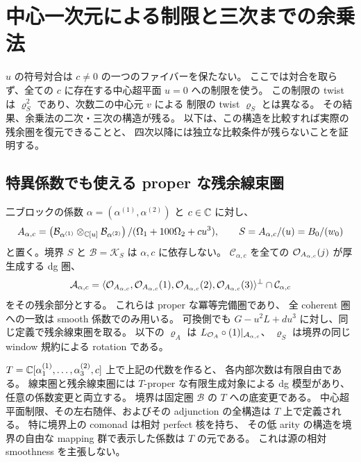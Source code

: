 \section{中心一次元による制限と三次までの余乗法}
\label{mix:sec:central-spherical-reconstruction}

$u$ の符号対合は $c\ne0$ の一つのファイバーを保たない。
ここでは対合を取らず、全ての $c$ に存在する中心超平面 $u=0$ への制限を使う。
この制限の twist は $\varrho_S^2$ であり、次数二の中心元 $v$ による
制限の twist $\varrho_S$ とは異なる。
その結果、余乗法の二次・三次の構造が残る。
以下は、この構造を比較すれば実際の残余圏を復元できることと、
四次以降には独立な比較条件が残らないことを証明する。

\subsection{特異係数でも使える proper な残余線束圏}

二ブロックの係数 $\alpha=(\alpha^{(1)},\alpha^{(2)})$ と $c\in\mathbb C$ に対し、
\[
 A_{\alpha,c}
 =\left(\mathcal B_{\alpha^{(1)}}\otimes_{\mathbb C[u]}
                   \mathcal B_{\alpha^{(2)}}\right)
       /(\Omega_1+100\Omega_2+cu^3),\qquad
 S=A_{\alpha,c}/(u)=B_0/(w_0)
\]
と置く。境界 $S$ と $\mathcal B=\mathcal K_S$ は $\alpha,c$ に依存しない。
$\mathcal C_{\alpha,c}$ を全ての $\mathcal O_{A_{\alpha,c}}(j)$ が厚生成する dg 圏、
\[
 \mathcal A_{\alpha,c}
 =\langle\mathcal O_{A_{\alpha,c}},\mathcal O_{A_{\alpha,c}}(1),
                   \mathcal O_{A_{\alpha,c}}(2),\mathcal O_{A_{\alpha,c}}(3)\rangle^\perp
       \cap\mathcal C_{\alpha,c}
\]
をその残余部分とする。
これらは proper な冪等完備圏であり、
全 coherent 圏への一致は smooth 係数でのみ用いる。
可換側でも $G-u^2L+du^3$ に対し、同じ定義で残余線束圏を取る。
以下の $\varrho_A$ は
$L_{\mathcal O_A}\circ(1)|_{\mathcal A_{\alpha,c}}$、
$\varrho_S$ は境界の同じ window 規約による rotation である。

\begin{lemma}
\label{cmo:lem:central-universal-line-model}
$T=\mathbb C[\alpha^{(1)}_1,\ldots,\alpha^{(2)}_3,c]$ 上で上記の代数を作ると、
各内部次数は有限自由である。
線束圏と残余線束圏には $T$-proper な有限生成対象による dg 模型があり、
任意の係数変更と両立する。
境界は固定圏 $\mathcal B$ の $T$ への底変更である。
中心超平面制限、その左右随伴、およびその adjunction の全構造は
$T$ 上で定義される。
特に境界上の comonad は相対 perfect 核を持ち、
その低 arity の構造を境界の自由な mapping 群で表示した係数は $T$ の元である。
これは源の相対 smoothness を主張しない。
\end{lemma}

